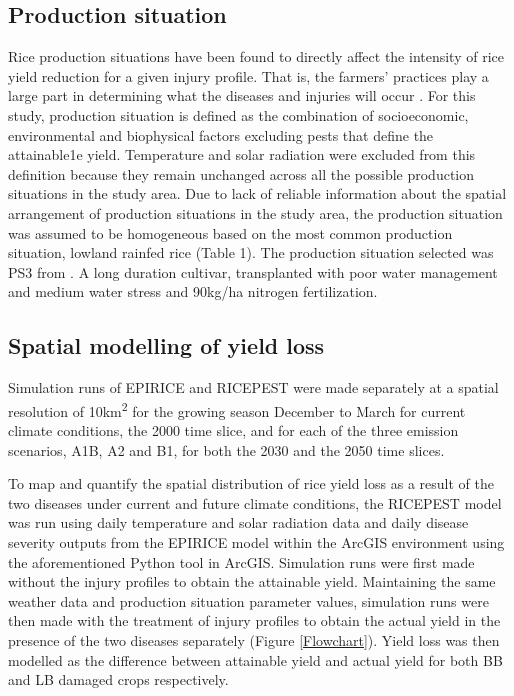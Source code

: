 \documentclass[preprint,12pt]{elsarticle}
\begin{document}
\subsection{Production situation}
Rice production situations have been found to directly affect the intensity of rice yield reduction for a given injury profile. That is, the farmers' practices play a large part in determining what the diseases and injuries will occur \cite{Savary2000}. For this study, production situation is defined as the combination of socioeconomic, environmental and biophysical factors excluding pests that define the attainable1e yield. Temperature and solar radiation were excluded from this definition because they remain unchanged across all the possible production situations in the study area. Due to lack of reliable information about the spatial arrangement of production situations in the study area, the production situation was assumed to be homogeneous based on the most common production situation, lowland rainfed rice \cite{Diagne2013} (Table 1). The production situation selected was PS3 from \citet{Willocquet2004}. A long duration cultivar, transplanted with poor water management and medium water stress and 90kg/ha nitrogen fertilization. 

\subsection{Spatial modelling of yield loss}
Simulation runs of EPIRICE and RICEPEST were made separately at a spatial resolution of 10km\textsuperscript{2} for the growing season December to March for current climate conditions, the 2000 time slice, and for each of the three emission scenarios, A1B, A2 and B1, for both the 2030 and the 2050 time slices.

To map and quantify the spatial distribution of rice yield loss as a result of the two diseases under current and future climate conditions, the RICEPEST model was run using daily temperature and solar radiation data and daily disease severity outputs from the EPIRICE model within the ArcGIS environment using the aforementioned Python tool in ArcGIS. Simulation runs were first made without the injury profiles to obtain the attainable yield. Maintaining the same weather data and production situation parameter values, simulation runs were then made with the treatment of injury profiles to obtain the actual yield in the presence of the two diseases separately (Figure \ref{Flowchart}). Yield loss was then modelled as the difference between attainable yield and actual yield for both BB and LB damaged crops respectively.
\end{document}
